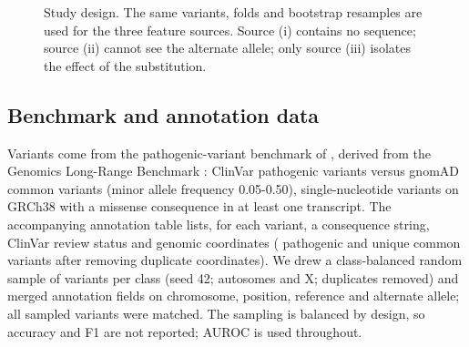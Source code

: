 \documentclass[11pt]{article}
\newcommand{\Dlt}{\Delta}
\begin{document}
\begin{figure}[t]
\centering
{}
\caption{Study design. The same variants, folds and bootstrap resamples are used for the three feature sources. Source (i) contains no sequence; source (ii) cannot see the alternate allele; only source (iii) isolates the effect of the substitution.}
\label{fig:design}
\end{figure}

\subsection{Benchmark and annotation data}
Variants come from the pathogenic-variant benchmark of \citet{feng2025benchmark}, derived from the Genomics Long-Range Benchmark \citep{kao2024lrb}: ClinVar pathogenic variants \citep{landrum2018clinvar} versus gnomAD common variants \citep{karczewski2020gnomad} (minor allele frequency 0.05-0.50), single-nucleotide variants on GRCh38 with a missense consequence in at least one transcript. The accompanying annotation table lists, for each variant, a consequence string, ClinVar review status and genomic coordinates (\TabNPath{} pathogenic and \TabNCommon{} unique common variants after removing duplicate coordinates). We drew a class-balanced random sample of \NPerClass{} variants per class (seed 42; autosomes and X; duplicates removed) and merged annotation fields on chromosome, position, reference and alternate allele; all \NSample{} sampled variants were matched. The sampling is balanced by design, so accuracy and F1 are not reported; AUROC is used throughout.
\end{document}
